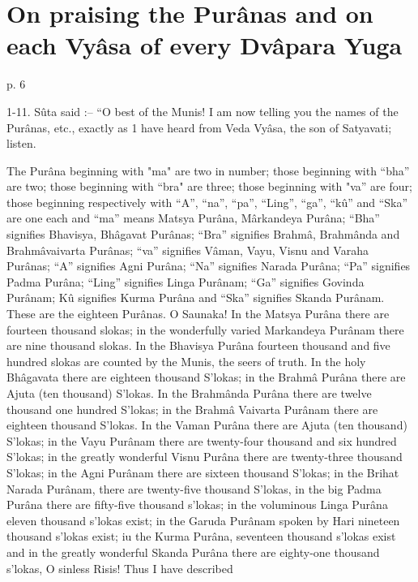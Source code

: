 \chapter{On praising the Purânas and on each Vyâsa of every Dvâpara Yuga}

 

p. 6

 

1-11. Sûta said :-- “O best of the Munis! I am now telling you the names of the Purânas, etc., exactly as 1 have heard from Veda Vyâsa, the son of Satyavati; listen.

 

The Purâna beginning with "ma" are two in number; those beginning with “bha” are two; those beginning with “bra" are three; those beginning with "va” are four; those beginning respectively with “A”, “na”, “pa”, “Ling”, “ga”, “kû” and “Ska” are one each and “ma” means Matsya Purâna, Mârkandeya Purâna; “Bha” signifies Bhavisya, Bhâgavat Purânas; “Bra” signifies Brahmâ, Brahmânda and Brahmâvaivarta Purânas; “va” signifies Vâman, Vayu, Visnu and Varaha Purânas; “A” signifies Agni Purâna; “Na” signifies Narada Purâna; “Pa” signifies Padma Purâna; “Ling” signifies Linga Purânam; “Ga” signifies Govinda Purânam; Kû signifies Kurma Purâna and “Ska” signifies Skanda Purânam. These are the eighteen Purânas. O Saunaka! In the Matsya Purâna there are fourteen thousand slokas; in the wonderfully varied Markandeya Purânam there are nine thousand slokas. In the Bhavisya Purâna fourteen thousand and five hundred slokas are counted by the Munis, the seers of truth. In the holy Bhâgavata there are eighteen thousand S’lokas; in the Brahmâ Purâna there are Ajuta (ten thousand) S’lokas. In the Brahmânda Purâna there are twelve thousand one hundred S’lokas; in the Brahmâ Vaivarta Purânam there are eighteen thousand S’lokas. In the Vaman Purâna there are Ajuta (ten thousand) S’lokas; in the Vayu Purânam there are twenty-four thousand and six hundred S’lokas; in the greatly wonderful Visnu Purâna there are twenty-three thousand S’lokas; in the Agni Purânam there are sixteen thousand S’lokas; in the Brihat Narada Purânam, there are twenty-five thousand S’lokas, in the big Padma Purâna there are fifty-five thousand s'lokas; in the voluminous Linga Purâna eleven thousand s’lokas exist; in the Garuda Purânam spoken by Hari nineteen thousand s'lokas exist; iu the Kurma Purâna, seventeen thousand s'lokas exist and in the greatly wonderful Skanda Purâna there are eighty-one thousand s'lokas, O sinless Risis! Thus I have described

